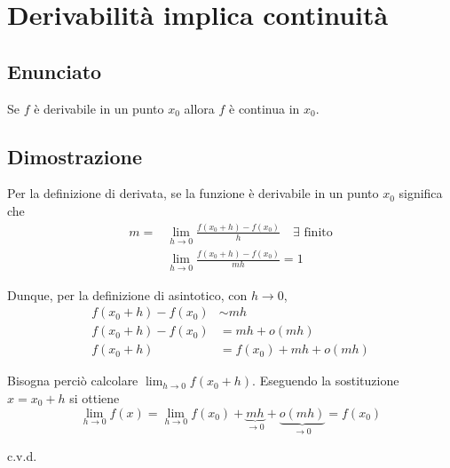 \documentclass[../../dimostrazioni]{subfiles}
\begin{document}
    \chapter{Derivabilità implica continuità}

        \section*{Enunciato}

            Se \(f\) è derivabile in un punto \(x_0\) allora \(f\) è continua in \(x_0\).

        \section*{Dimostrazione}

            Per la definizione di derivata, se la funzione è derivabile in un punto \(x_0\)
            significa che
            \begin{align*}
                m = &\lim_{h \to 0} \frac{f(x_0 + h) - f(x_0)}{h} \quad \exists \text{ finito}\\
                &\lim_{h \to 0} \frac{f(x_0 + h) - f(x_0)}{m h} = 1
            \end{align*}

            Dunque, per la definizione di asintotico, con \(h \to 0\),
            \begin{align*}
                f(x_0 + h) - f(x_0) &\sim m h\\
                f(x_0 + h) - f(x_0) &= m h + o(m h)\\
                f(x_0 + h) &= f(x_0) + m h + o(m h)
            \end{align*}

            Bisogna perciò calcolare \(\lim_{h \to 0} f(x_0 + h)\). Eseguendo la sostituzione
            \(x = x_0 + h\) si ottiene
            \[
                \lim_{h \to 0} f(x) = \lim_{h \to 0} f(x_0) + \underbrace{mh}_{\to 0} + \underbrace{o(mh)}_{\to 0} = f(x_0)
            \]

            c.v.d.
\end{document}
